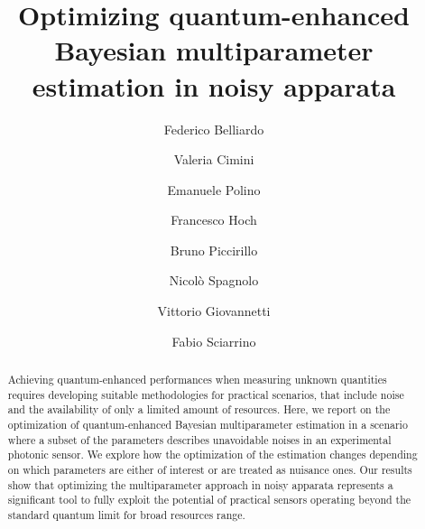 \documentclass[aps,pra,twocolumn,notitlepage,superscriptaddress]{revtex4-1}
\begin{document}
\title{Optimizing quantum-enhanced Bayesian multiparameter estimation in noisy apparata}

\author{Federico Belliardo}

\author{Valeria Cimini}

\author{Emanuele Polino}

\author{Francesco Hoch}

\author{Bruno Piccirillo}

\author{Nicol\`o Spagnolo}

\author{Vittorio Giovannetti}

\author{Fabio Sciarrino}

\begin{abstract}
Achieving quantum-enhanced performances when measuring unknown quantities requires developing suitable methodologies for practical scenarios, that include noise and the availability of only a limited amount of resources. Here, we report on the optimization of quantum-enhanced Bayesian multiparameter estimation in a scenario where a subset of the parameters describes unavoidable noises in an experimental photonic sensor. We explore how the optimization of the estimation changes depending on which parameters are either of interest or are treated as nuisance ones. Our results show that optimizing the multiparameter approach in noisy apparata represents a significant tool to fully exploit the potential of practical sensors operating beyond the standard quantum limit for broad resources range.

\end{abstract}
\end{document}
